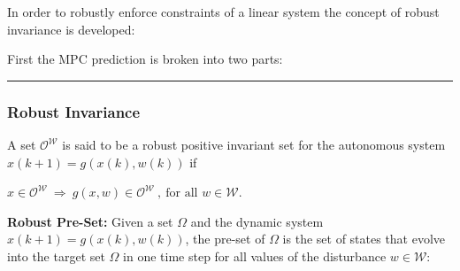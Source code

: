 \documentclass[8pt,a4paper]{scrartcl}
\begin{document}
\begin{multicols*}{3}
\begin{multicols*}{4}
In order to robustly enforce constraints of a linear system the concept of robust invariance is developed:

\finn

First the MPC prediction is broken into two parts:

{
}

\finn

\hrule

\finn


\subsubsection{Robust Invariance}

A set $\mathcal{O}^\mathcal{W}$ is said to be a robust positive invariant set for the autonomous system $x(k+1)=g(x(k),w(k))$ if

$x\in\mathcal{O}^\mathcal{W}\ \Rightarrow\ g(x,w)\in\mathcal{O}^\mathcal{W}\ ,\ \text{for all }w\in\mathcal{W}$.

\finn

\textbf{Robust Pre-Set: }Given a set $\Omega$ and the dynamic system $x(k+1)=g(x(k),w(k))$, the pre-set of $\Omega$ is the set of states that evolve into the target set $\Omega$ in one time step for all values of the disturbance $w\in\mathcal{W}$:


\end{multicols*}
\end{multicols*}
\end{document}
